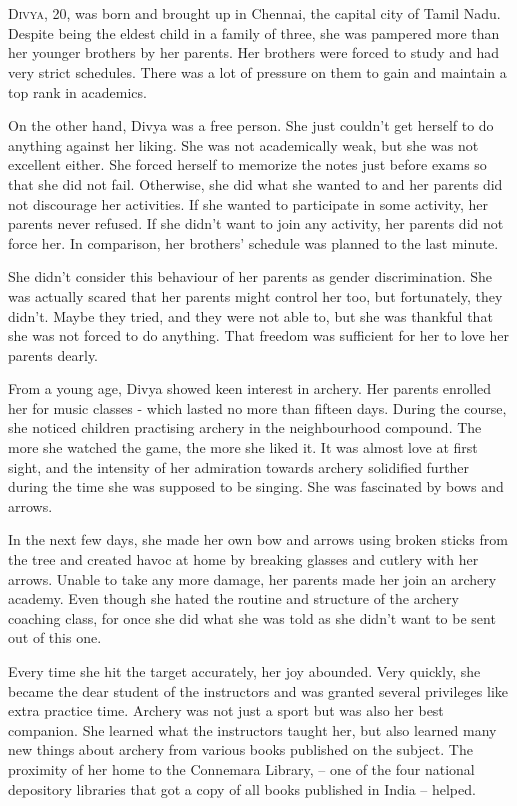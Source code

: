 \chapter{}

\lettrine{D}{ivya}, 20, was born and brought up in Chennai, the capital city of Tamil Nadu.
Despite being the eldest child in a family of three, she was pampered more than
her younger brothers by her parents. Her brothers were forced to study and had
very strict schedules. There was a lot of pressure on them to gain and maintain a
top rank in academics.

On the other hand, Divya was a free person. She just couldn't get herself to do
anything against her liking. She was not academically weak, but she was not
excellent either. She forced herself to memorize the notes just before exams so
that she did not fail. Otherwise, she did what she wanted to and her parents did
not discourage her activities. If she wanted to participate in some activity,
her parents never refused. If she didn't want to join any activity, her parents
did not force her. In comparison, her brothers' schedule was planned to the last
minute.

She didn't consider this behaviour of her parents as gender discrimination. She
was actually scared that her parents might control her too, but fortunately,
they didn't. Maybe they tried, and they were not able to, but she was thankful
that she was not forced to do anything. That freedom was sufficient for her to
love her parents dearly.

From a young age, Divya showed keen interest in archery. Her parents enrolled
her for music classes - which lasted no more than fifteen days. During the
course, she noticed children practising archery in the neighbourhood compound.
The more she watched the game, the more she liked it. It was almost love at
first sight, and the intensity of her admiration towards archery solidified
further during the time she was supposed to be singing. She was fascinated by
bows and arrows.

In the next few days, she made her own bow and arrows using broken sticks from
the tree and created havoc at home by breaking glasses and cutlery with her
arrows. Unable to take any more damage, her parents made her join an archery
academy. Even though she hated the routine and structure of the archery coaching
class, for once she did what she was told as she didn't want to be sent out of
this one.

Every time she hit the target accurately, her joy abounded. Very quickly, she
became the dear student of the instructors and was granted several privileges
like extra practice time. Archery was not just a sport but was also her best
companion. She learned what the instructors taught her, but also learned many
new things about archery from various books published on the subject. The
proximity of her home to the Connemara Library, – one of the four national
depository libraries that got a copy of all books published in India – helped.

